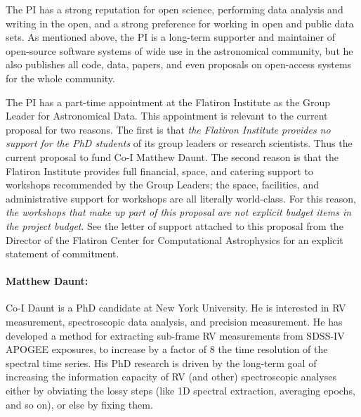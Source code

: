\documentclass[12pt]{article}
\begin{document}
The PI has a strong reputation for open science, performing data analysis and writing in the open, and a strong preference for working in open and public data sets. As mentioned above, the PI is a long-term supporter and maintainer of open-source software systems of wide use in the astronomical community, but he also publishes all code, data, papers, and even proposals on open-access systems for the whole community.

The PI has a part-time appointment at the Flatiron Institute as the Group Leader for Astronomical Data.
This appointment is relevant to the current proposal for two reasons.
The first is that \emph{the Flatiron Institute provides no support for the PhD students} of its group leaders or research scientists.
Thus the current proposal to fund Co-I Matthew Daunt.
The second reason is that the Flatiron Institute provides full financial, space, and catering support to workshops recommended by the Group Leaders; the space, facilities, and administrative support for workshops are all literally world-class.
For this reason, \emph{the workshops that make up part of this proposal are not explicit budget items in the project budget}.
See the letter of support attached to this proposal from the Director of the Flatiron Center for Computational Astrophysics for an explicit statement of commitment.

\paragraph{Matthew Daunt:}
Co-I Daunt is a PhD candidate at New York University.
He is interested in RV measurement, spectroscopic data analysis, and precision measurement.
He has developed a method for extracting sub-frame RV measurements from SDSS-IV APOGEE exposures, to increase by a factor of 8 the time resolution of the spectral time series.
His PhD research is driven by the long-term goal of increasing the information capacity of RV (and other) spectroscopic analyses either by obviating the lossy steps (like 1D spectral extraction, averaging epochs, and so on), or else by fixing them.
\end{document}
